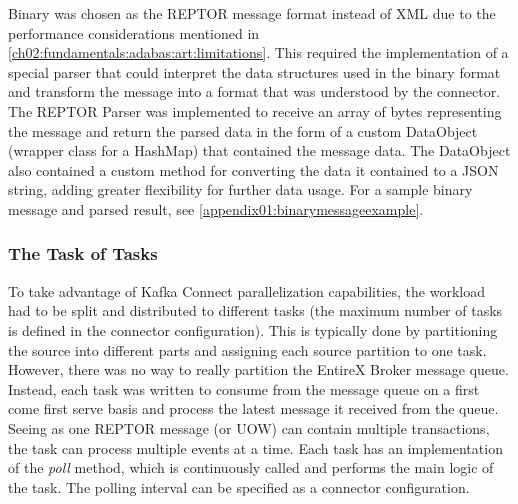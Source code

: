 Binary was chosen as the \ac{REPTOR} message format instead of XML due to the performance considerations mentioned in \ref{ch02:fundamentals:adabas:art:limitations}. This required the implementation of a special parser that could interpret the data structures used in the binary format and transform the message into a format that was understood by the connector. The \ac{REPTOR} Parser was implemented to receive an array of bytes representing the message and return the parsed data in the form of a custom DataObject (wrapper class for a HashMap) that contained the message data. The DataObject also contained a custom method for converting the data it contained to a JSON string, adding greater flexibility for further data usage. For a sample binary message and parsed result, see \ref{appendix01:binarymessageexample}.




\subsubsection{The Task of Tasks}
To take advantage of Kafka Connect parallelization capabilities, the workload had to be split and distributed to different tasks (the maximum number of tasks is defined in the connector configuration). This is typically done by partitioning the source into different parts and assigning each source partition to one task. However, there was no way to really partition the EntireX Broker message queue. Instead, each task was written to consume from the message queue on a first come first serve basis and process the latest message it received from the queue. Seeing as one \ac{REPTOR} message (or \ac{UOW}) can contain multiple transactions, the task can process multiple events at a time. Each task has an implementation of the \textit{poll} method, which is continuously called and performs the main logic of the task. The polling interval can be specified as a connector configuration.

